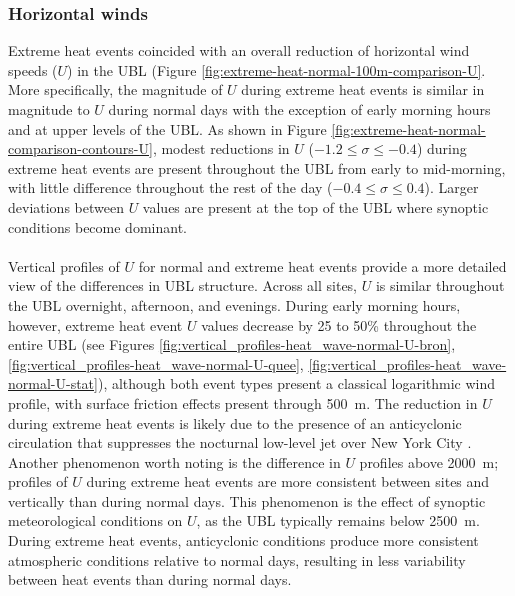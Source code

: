 \documentclass[num-refs]{wiley-article}
\begin{document}
\subsubsection{Horizontal winds}
Extreme heat events coincided with an overall reduction of horizontal wind speeds ($U$) in the UBL (Figure \ref{fig:extreme-heat-normal-100m-comparison-U}. More specifically, the magnitude of $U$ during extreme heat events is similar in magnitude to $U$ during normal days with the exception of early morning hours and at upper levels of the UBL. As shown in Figure \ref{fig:extreme-heat-normal-comparison-contours-U}, modest reductions in $U$ ($-1.2 \leq \sigma \leq -0.4$) during extreme heat events are present throughout the UBL from early to mid-morning, with little difference throughout the rest of the day ($-0.4 \leq \sigma \leq 0.4$). Larger deviations between $U$ values are present at the top of the UBL where synoptic conditions become dominant.
\\ \\
Vertical profiles of $U$ for normal and extreme heat events provide a more detailed view of the differences in UBL structure. Across all sites, $U$ is similar throughout the UBL overnight, afternoon, and evenings. During early morning hours, however, extreme heat event $U$ values decrease by 25 to 50\% throughout the entire UBL (see Figures \ref{fig:vertical_profiles-heat_wave-normal-U-bron}, \ref{fig:vertical_profiles-heat_wave-normal-U-quee}, \ref{fig:vertical_profiles-heat_wave-normal-U-stat}), although both event types present a classical logarithmic wind profile, with surface friction effects present through \SI{500}{\meter}. The reduction in $U$ during extreme heat events is likely due to the presence of an anticyclonic circulation that suppresses the nocturnal low-level jet over New York City \citep{chen1993}. Another phenomenon worth noting is the difference in $U$ profiles above \SI{2000}{\meter}; profiles of $U$ during extreme heat events are more consistent between sites and vertically than during normal days. This phenomenon is the effect of synoptic meteorological conditions on $U$, as the UBL typically remains below \SI{2500}{\meter}. During extreme heat events, anticyclonic conditions produce more consistent atmospheric conditions relative to normal days, resulting in less variability between heat events than during normal days.
\\ \\
\end{document}
